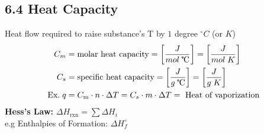 \subsection{6.4 Heat Capacity}
    Heat flow required to raise substance's T by $1$ degree $^\circ C$ (or $K$)
    \begin{align*}
        C_m & = \text{molar heat capacity} = \left[\frac{J}{mol \; \tccentigrade}\right] = \left[\frac{J}{mol \; K}\right]\\
        C_s & = \text{specific heat capacity} = \left[\frac{J}{g \; \tccentigrade}\right] = \left[\frac{J}{g \; K}\right]\\
        \text{Ex.} \; q & = C_\text{m} \cdot n \cdot \Delta T = C_s \cdot m \cdot \Delta T = \text{ Heat of vaporization}
    \end{align*}
    \textbf{Hess's Law:} $\Delta H_\text{rxn} = \sum \Delta H_i$\\
    e.g Enthalpies of Formation: $\Delta H^\circ_f$